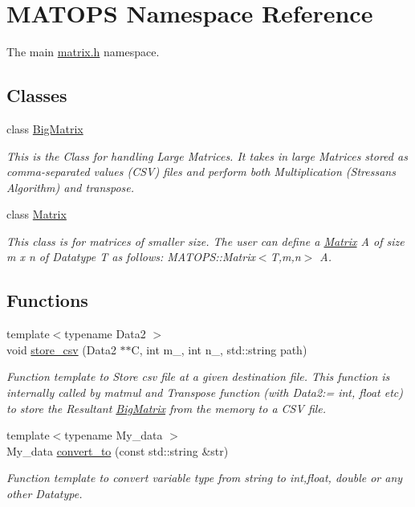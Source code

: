 \hypertarget{namespaceMATOPS}{}\section{M\+A\+T\+O\+PS Namespace Reference}
\label{namespaceMATOPS}


The main \hyperlink{matrix_8h}{matrix.\+h} namespace.  


\subsection*{Classes}
\begin{DoxyCompactItemize}
\item 
class \hyperlink{classMATOPS_1_1BigMatrix}{Big\+Matrix}
\begin{DoxyCompactList}\small\item\em This is the Class for handling Large Matrices. It takes in large Matrices stored as comma-\/separated values (C\+SV) files and perform both Multiplication (Stressan\textquotesingle{}s Algorithm) and transpose. \end{DoxyCompactList}\item 
class \hyperlink{classMATOPS_1_1Matrix}{Matrix}
\begin{DoxyCompactList}\small\item\em This class is for matrices of smaller size. The user can define a \hyperlink{classMATOPS_1_1Matrix}{Matrix} A of size m x n of Datatype T as follows\+: M\+A\+T\+O\+P\+S\+::\+Matrix$<$\+T,m,n$>$ A. \end{DoxyCompactList}\end{DoxyCompactItemize}
\subsection*{Functions}
\begin{DoxyCompactItemize}
\item 
{\footnotesize template$<$typename Data2 $>$ }\\void \hyperlink{namespaceMATOPS_a2050c01cf601a211d3abc45515b8749d}{store\+\_\+csv} (Data2 $\ast$$\ast$C, int m\+\_, int n\+\_, std\+::string path)
\begin{DoxyCompactList}\small\item\em Function template to Store csv file at a given destination file. This function is internally called by matmul and Transpose function (with Data2\+:= int, float etc) to store the Resultant \hyperlink{classMATOPS_1_1BigMatrix}{Big\+Matrix} from the memory to a C\+SV file. \end{DoxyCompactList}\item 
{\footnotesize template$<$typename My\+\_\+data $>$ }\\My\+\_\+data \hyperlink{namespaceMATOPS_a058c07f65db98cd52617d3d5c4de3b42}{convert\+\_\+to} (const std\+::string \&str)
\begin{DoxyCompactList}\small\item\em Function template to convert variable type from string to int,float, double or any other Datatype. \end{DoxyCompactList}\end{DoxyCompactItemize}


